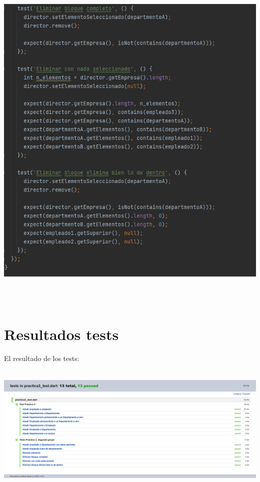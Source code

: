\documentclass[openany]{article}
\begin{document}
\includegraphics[width=6.26772in,height=6.77778in]{imagenes/testGrupo2part3.png}

\pagebreak
\section{Resultados tests} \label{results}
El resultado de los tests:\newline


\includegraphics[width=6.26772in,height=2.44444in]{imagenes/testPasados.png}
\end{document}

